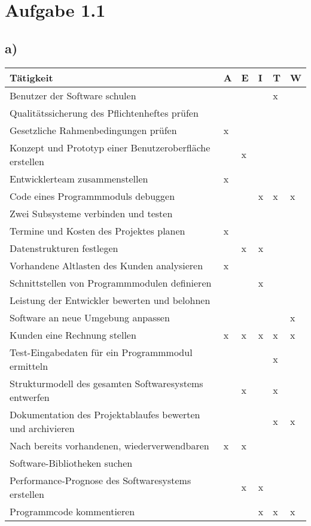 \documentclass[a4paper,11pt]{scrartcl}
\begin{document}
		
	\section*{Aufgabe 1.1}
	\subsection*{a)}
	\begin{table}[h!]
		\begin{tabular}{l|l|l|l|l|l}
		 \textbf{Tätigkeit} 										&A &E &I &T &W \\ 
		 \hline
		 Benutzer der Software schulen								&  &  &  &x &  \\
		 Qualitätssicherung des Pflichtenheftes prüfen				&  &  &  &  &  \\
		 Gesetzliche Rahmenbedingungen prüfen						&x &  &  &  &  \\
		 Konzept und Prototyp einer Benutzeroberfläche erstellen	&  &x &  &  &  \\
		 Entwicklerteam zusammenstellen								&x &  &  &  &  \\
		 Code eines Programmmoduls debuggen							&  &  &x &x &x \\
 		 Zwei Subsysteme verbinden und testen						&  &  &  &  &  \\
 		 Termine und Kosten des Projektes planen					&x &  &  &  &  \\
		 Datenstrukturen festlegen									&  &x &x &  &  \\
		 Vorhandene Altlasten des Kunden analysieren				&x &  &  &  &  \\
		 Schnittstellen von Programmmodulen definieren				&  &  &x &  &  \\
		 Leistung der Entwickler bewerten und belohnen				&  &  &  &  &  \\
		 Software an neue Umgebung anpassen							&  &  &  &  &x \\
		 Kunden eine Rechnung stellen								&x &x &x &x &x \\
		 Test-Eingabedaten für ein Programmmodul ermitteln			&  &  &  &x &  \\ 
		 Strukturmodell des gesamten Softwaresystems entwerfen		&  &x &  &x &  \\ 
		 Dokumentation des Projektablaufes bewerten und archivieren	&  &  &  &x &x \\ 
		 Nach bereits vorhandenen, wiederverwendbaren 				&x &x &  &  &  \\ 
		 	Software-Bibliotheken suchen	&  &  &  &  &  \\ 	
		 Performance-Prognose des Softwaresystems erstellen			&  &x &x &  &  \\ 
		 Programmcode kommentieren									&  &  &x &x &x \\ 
		\end{tabular}
	\end{table}
\end{document}

